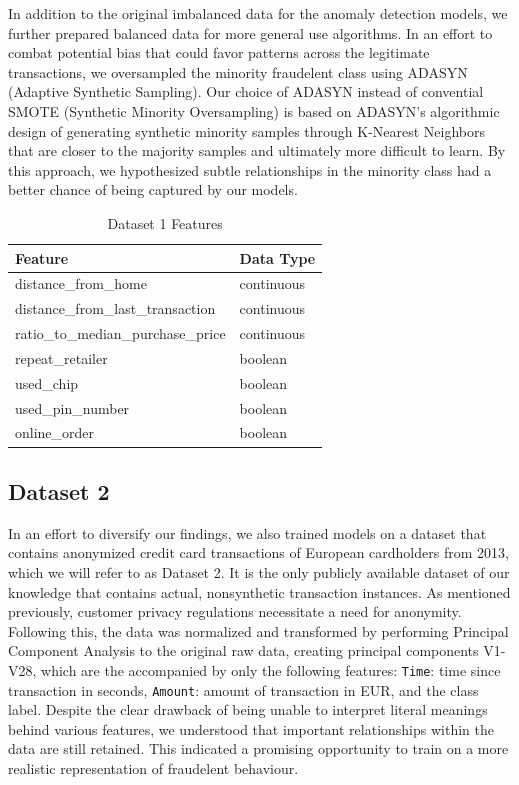 \documentclass{article}
\begin{document}
 In addition to the original imbalanced data for the anomaly detection models, we further prepared balanced data for more general use algorithms. In an effort to combat potential bias that could favor patterns across the legitimate transactions, we oversampled the minority fraudelent class using ADASYN (Adaptive Synthetic Sampling). Our choice of ADASYN instead of convential SMOTE (Synthetic Minority Oversampling) is based on ADASYN's  algorithmic design of generating synthetic minority samples through K-Nearest Neighbors that are closer to the majority samples and ultimately more difficult to learn. By this approach, we hypothesized subtle relationships in the minority class had a better chance of being captured by our models. 

\begin{table}[h]
\centering
\begin{tabular}{ll} 
\toprule
Feature & Data Type \\
\midrule
distance\_from\_home & continuous \\
distance\_from\_last\_transaction & continuous \\
ratio\_to\_median\_purchase\_price & continuous \\
repeat\_retailer & boolean \\
used\_chip & boolean \\
used\_pin\_number & boolean \\
online\_order & boolean \\
\bottomrule
\end{tabular}
\caption{Dataset 1 Features} %
\label{tab:dataset_features}
\end{table}

\subsection{Dataset 2}
In an effort to diversify our findings, we also trained models on a dataset that contains anonymized credit card transactions of European cardholders from 2013, which we will refer to as Dataset 2. It is the only publicly available dataset of our knowledge that contains actual, nonsynthetic transaction instances. As mentioned previously, customer privacy regulations necessitate a need for anonymity. Following this, the data was normalized and transformed by performing Principal Component Analysis to the original raw data, creating principal components V1-V28, which are the accompanied by only the following features: \texttt{Time}: time since transaction in seconds, \texttt{Amount}: amount of transaction in EUR, and the class label. Despite the clear drawback of being unable to interpret literal meanings behind various features, we understood that important relationships within the data are still retained. This indicated a promising opportunity to train on a more realistic representation of fraudelent behaviour. 
\end{document}
